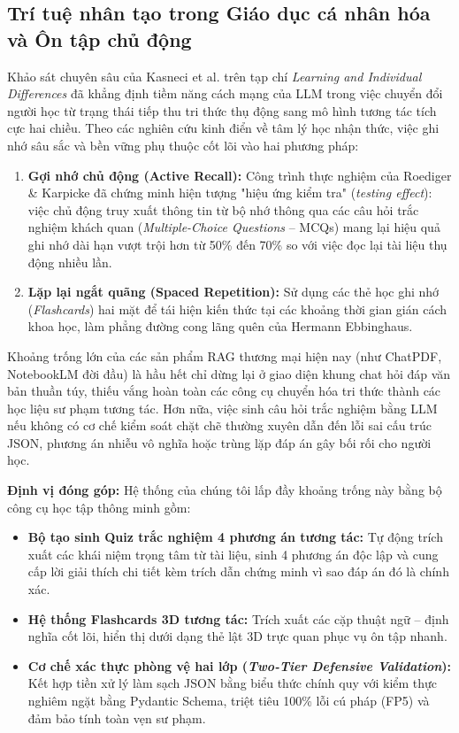 ﻿\documentclass[12pt]{article}
\begin{document}
\subsection{Trí tuệ nhân tạo trong Giáo dục cá nhân hóa và Ôn tập chủ động}
Khảo sát chuyên sâu của Kasneci et al. \cite{kasneci2023education} trên tạp chí \textit{Learning and Individual Differences} đã khẳng định tiềm năng cách mạng của LLM trong việc chuyển đổi người học từ trạng thái tiếp thu tri thức thụ động sang mô hình tương tác tích cực hai chiều. Theo các nghiên cứu kinh điển về tâm lý học nhận thức, việc ghi nhớ sâu sắc và bền vững phụ thuộc cốt lõi vào hai phương pháp:
\begin{enumerate}
    \item \textbf{Gợi nhớ chủ động (Active Recall):} Công trình thực nghiệm của Roediger \& Karpicke \cite{roediger2006testing} đã chứng minh hiện tượng "hiệu ứng kiểm tra" (\textit{testing effect}): việc chủ động truy xuất thông tin từ bộ nhớ thông qua các câu hỏi trắc nghiệm khách quan (\textit{Multiple-Choice Questions} -- MCQs) mang lại hiệu quả ghi nhớ dài hạn vượt trội hơn từ 50\% đến 70\% so với việc đọc lại tài liệu thụ động nhiều lần.
    \item \textbf{Lặp lại ngắt quãng (Spaced Repetition):} Sử dụng các thẻ học ghi nhớ (\textit{Flashcards}) hai mặt để tái hiện kiến thức tại các khoảng thời gian gián cách khoa học, làm phẳng đường cong lãng quên của Hermann Ebbinghaus.
\end{enumerate}

Khoảng trống lớn của các sản phẩm RAG thương mại hiện nay (như ChatPDF, NotebookLM đời đầu) là hầu hết chỉ dừng lại ở giao diện khung chat hỏi đáp văn bản thuần túy, thiếu vắng hoàn toàn các công cụ chuyển hóa tri thức thành các học liệu sư phạm tương tác. Hơn nữa, việc sinh câu hỏi trắc nghiệm bằng LLM nếu không có cơ chế kiểm soát chặt chẽ thường xuyên dẫn đến lỗi sai cấu trúc JSON, phương án nhiễu vô nghĩa hoặc trùng lặp đáp án gây bối rối cho người học.

\noindent \textbf{Định vị đóng góp:} Hệ thống của chúng tôi lấp đầy khoảng trống này bằng bộ công cụ học tập thông minh gồm:
\begin{itemize}
    \item \textbf{Bộ tạo sinh Quiz trắc nghiệm 4 phương án tương tác:} Tự động trích xuất các khái niệm trọng tâm từ tài liệu, sinh 4 phương án độc lập và cung cấp lời giải thích chi tiết kèm trích dẫn chứng minh vì sao đáp án đó là chính xác.
    \item \textbf{Hệ thống Flashcards 3D tương tác:} Trích xuất các cặp thuật ngữ -- định nghĩa cốt lõi, hiển thị dưới dạng thẻ lật 3D trực quan phục vụ ôn tập nhanh.
    \item \textbf{Cơ chế xác thực phòng vệ hai lớp (\textit{Two-Tier Defensive Validation}):} Kết hợp tiền xử lý làm sạch JSON bằng biểu thức chính quy với kiểm thực nghiêm ngặt bằng Pydantic Schema, triệt tiêu 100\% lỗi cú pháp (FP5) và đảm bảo tính toàn vẹn sư phạm.
\end{itemize}
\end{document}
